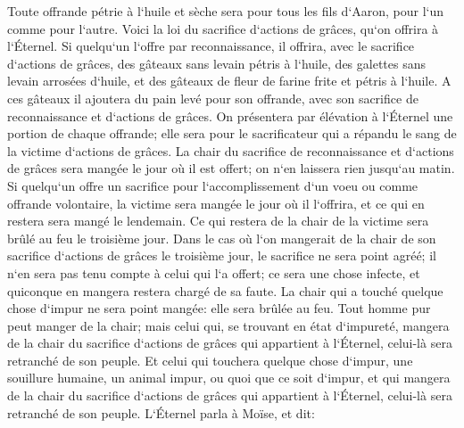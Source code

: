 \verse Toute offrande pétrie à l`huile et sèche sera pour tous les fils d`Aaron, pour l`un comme pour l`autre. 
\verse Voici la loi du sacrifice d`actions de grâces, qu`on offrira à l`Éternel. 
\verse Si quelqu`un l`offre par reconnaissance, il offrira, avec le sacrifice d`actions de grâces, des gâteaux sans levain pétris à l`huile, des galettes sans levain arrosées d`huile, et des gâteaux de fleur de farine frite et pétris à l`huile. 
\verse A ces gâteaux il ajoutera du pain levé pour son offrande, avec son sacrifice de reconnaissance et d`actions de grâces. 
\verse On présentera par élévation à l`Éternel une portion de chaque offrande; elle sera pour le sacrificateur qui a répandu le sang de la victime d`actions de grâces. 
\verse La chair du sacrifice de reconnaissance et d`actions de grâces sera mangée le jour où il est offert; on n`en laissera rien jusqu`au matin. 
\verse Si quelqu`un offre un sacrifice pour l`accomplissement d`un voeu ou comme offrande volontaire, la victime sera mangée le jour où il l`offrira, et ce qui en restera sera mangé le lendemain. 
\verse Ce qui restera de la chair de la victime sera brûlé au feu le troisième jour. 
\verse Dans le cas où l`on mangerait de la chair de son sacrifice d`actions de grâces le troisième jour, le sacrifice ne sera point agréé; il n`en sera pas tenu compte à celui qui l`a offert; ce sera une chose infecte, et quiconque en mangera restera chargé de sa faute. 
\verse La chair qui a touché quelque chose d`impur ne sera point mangée: elle sera brûlée au feu. 
\verse Tout homme pur peut manger de la chair; mais celui qui, se trouvant en état d`impureté, mangera de la chair du sacrifice d`actions de grâces qui appartient à l`Éternel, celui-là sera retranché de son peuple. 
\verse Et celui qui touchera quelque chose d`impur, une souillure humaine, un animal impur, ou quoi que ce soit d`impur, et qui mangera de la chair du sacrifice d`actions de grâces qui appartient à l`Éternel, celui-là sera retranché de son peuple. 
\verse L`Éternel parla à Moïse, et dit: 
